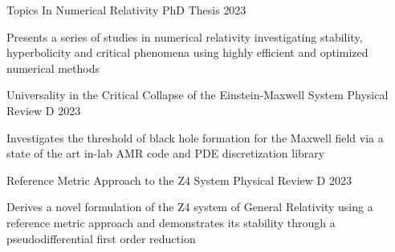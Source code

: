 
\begin{cventries}
    \cventrythree
    {Topics In Numerical Relativity} %
    {} %
    {PhD Thesis} %
    {2023} %
    {\begin{cvitems} %
        \item Presents a series of studies in numerical relativity investigating stability, hyperbolicity and critical phenomena using highly efficient and optimized numerical methods
    \end{cvitems}}
    
    
    \cventrythree
    {Universality in the Critical Collapse of the Einstein-Maxwell System} %
    {} %
    {Physical Review D} %
    {2023} %
    {\begin{cvitems} %
        \item Investigates the threshold of black hole formation for the Maxwell field via a state of the art in-lab AMR code and PDE discretization library
    \end{cvitems}}

    \cventrythree
    {Reference Metric Approach to the Z4 System} %
    {} %
    {Physical Review D} %
    {2023} %
    {\begin{cvitems} %
        \item Derives a novel formulation of the Z4 system of General Relativity using a reference metric approach and demonstrates its stability through a pseudodifferential first order reduction
    \end{cvitems}}
    

\end{cventries}
